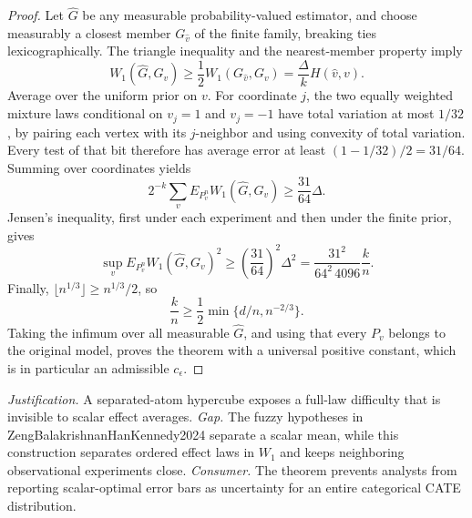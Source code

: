 \documentclass{article}
\begin{document}
\begin{proof}
Let \(\widehat G\) be any measurable probability-valued estimator, and choose measurably a closest member \(G_{\widehat v}\) of the finite family, breaking ties lexicographically.  The triangle inequality and the nearest-member property imply
\[
W_1(\widehat G,G_v)\geq\frac12W_1(G_{\widehat v},G_v)
=\frac{\Delta}{k}H(\widehat v,v).
\]
Average over the uniform prior on \(v\).  For coordinate \(j\), the two equally weighted mixture laws conditional on \(v_j=1\) and \(v_j=-1\) have total variation at most \(1/32\), by pairing each vertex with its \(j\)-neighbor and using convexity of total variation.  Every test of that bit therefore has average error at least \((1-1/32)/2=31/64\).  Summing over coordinates yields
\[
2^{-k}\sum_vE_{P_v^n}W_1(\widehat G,G_v)
\geq\frac{31}{64}\Delta.
\]
Jensen's inequality, first under each experiment and then under the finite prior, gives
\[
\sup_vE_{P_v^n}W_1(\widehat G,G_v)^2
\geq\left(\frac{31}{64}\right)^2\Delta^2
=\frac{31^2}{64^2\,4096}\frac{k}{n}.
\]
Finally, \(\lfloor n^{1/3}\rfloor\geq n^{1/3}/2\), so
\[
\frac{k}{n}\geq\frac12\min\{d/n,n^{-2/3}\}.
\]
Taking the infimum over all measurable \(\widehat G\), and using that every \(P_v\) belongs to the original model, proves the theorem with a universal positive constant, which is in particular an admissible \(c_\epsilon\).
\end{proof}
\par\smallskip\noindent \textit{Justification.} A separated-atom hypercube exposes a full-law difficulty that is invisible to scalar effect averages. \textit{Gap.} The fuzzy hypotheses in ZengBalakrishnanHanKennedy2024 separate a scalar mean, while this construction separates ordered effect laws in \(W_1\) and keeps neighboring observational experiments close. \textit{Consumer.} The theorem prevents analysts from reporting scalar-optimal error bars as uncertainty for an entire categorical CATE distribution.
\end{document}
